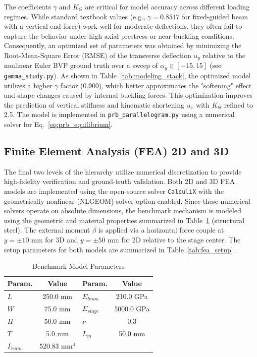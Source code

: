 \documentclass[colorlinks,upint,subscriptcorrection,varvw,hyphenate,balance]{asmeconf} %
\begin{document}
The coefficients $\gamma$ and $K_\Theta$ are critical for model accuracy across different loading regimes. While standard textbook values (e.g., $\gamma=0.8517$ for fixed-guided beam with a vertical end force) work well for moderate deflections, they often fail to capture the behavior under high axial prestress or near-buckling conditions. Consequently, an optimized set of parameters was obtained by minimizing the Root-Mean-Square Error (RMSE) of the transverse deflection $u_y$ relative to the nonlinear Euler BVP ground truth over a sweep of $\alpha_y \in [-15, 15]$ (see \texttt{gamma\_study.py}). As shown in Table~\ref{tab:modeling_stack}, the optimized model utilizes a higher $\gamma$ factor (0.900), which better approximates the "softening" effect and shape changes caused by internal buckling forces. This optimization improves the prediction of vertical stiffness and kinematic shortening $u_x$ with $K_\Theta$ refined to 2.5. The model is implemented in \texttt{prb\_parallelogram.py} using a numerical solver for Eq.~\eqref{eq:prb_equilibrium}.


\subsection{Finite Element Analysis (FEA) 2D and 3D}
\label{sec:fea}
The final two levels of the hierarchy utilize numerical discretization to provide high-fidelity verification and ground-truth validation. Both 2D and 3D FEA models are implemented using the open-source solver \texttt{CalculiX} with the geometrically nonlinear (NLGEOM) solver option enabled. Since these numerical solvers operate on absolute dimensions, the benchmark mechanism is modeled using the geometric and material properties summarized in Table~\ref{tab:model_params} (structural steel). The external moment $\beta$ is applied via a horizontal force couple at $y = \pm 10\text{ mm}$ for 3D and $y = \pm 50\text{ mm}$ for 2D relative to the stage center. The setup parameters for both models are summarized in Table~\ref{tab:fea_setup}.

\begin{table}[ht]
\centering
\caption{Benchmark Model Parameters}
\label{tab:model_params}
\begin{tabular}{lc|lc}
\toprule
\textbf{Param.} & \textbf{Value} & \textbf{Param.} & \textbf{Value} \\
\midrule
$L$ & 250.0 mm & $E_{beam}$ & 210.0 GPa \\
$W$ & 75.0 mm & $E_{stage}$ & 5000.0 GPa \\
$H$ & 50.0 mm & $\nu$ & 0.3 \\
$T$ & 5.0 mm & $L_{m}$ & 50.0 mm \\
$I_{beam}$ & $520.83 \text{ mm}^4$ & & \\
\bottomrule
\end{tabular}
\end{table}
\end{document}
